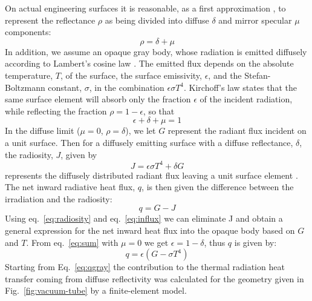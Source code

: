 On actual engineering surfaces it is reasonable, as a first approximation \cite{sparrow_1965, siegel-howell-3}, to represent the reflectance
$\rho$ as being divided into diffuse $\delta$ and mirror specular $\mu$
components:
\begin{equation}
\label{eq:reflectivity}
\rho = \delta + \mu
\end{equation}
In addition,
we assume an opaque gray body, whose radiation
is emitted diffusely according to Lambert's cosine law
\cite{siegel-howell-3}. The emitted flux depends on
the absolute temperature, $T$, of the surface, the surface
emissivity, $\epsilon$, and the Stefan-Boltzmann constant, $\sigma$, in the
combination $\epsilon\sigma T^4$. Kirchoff's law states that the same
surface element will absorb only the fraction $\epsilon$ of the incident
radiation, while reflecting the fraction $\rho = 1 - \epsilon$, so
that
\begin{equation}
\label{eq:sum}
\epsilon + \delta + \mu = 1
\end{equation}
In the diffuse limit ($\mu =0$, $\rho=\delta$), we let $G$ represent the radiant flux incident on a unit
surface. Then for a diffusely emitting surface with a
diffuse reflectance, $\delta$, the radiosity, $J$, given
by
\begin{equation}
\label{eq:radiosity}
J = \epsilon\sigma T^4 + \delta G
\end{equation}
represents the diffusely distributed radiant flux leaving
a unit surface element \cite{tsai_1986}. 
The net inward radiative heat flux, $q$, is then given the difference between the irradiation and the radiosity:
\begin{equation}
\label{eq:influx}
q = G - J
\end{equation}
Using eq.~\ref{eq:radiosity} and eq.~\ref{eq:influx} we can eliminate J and obtain a general expression for the net inward heat flux into the opaque body based on $G$ and $T$. From eq.~\ref{eq:sum} with $\mu = 0$ we get $\epsilon = 1 -\delta$, thus $q$ is given by:
\begin{equation}
\label{eq:qgray}
q = \epsilon\left( G - \sigma T^4 \right)
\end{equation}
Starting from Eq.~\ref{eq:qgray} the contribution to the thermal radiation heat transfer coming from diffuse reflectivity was calculated for the geometry given in Fig.~\ref{fig:vacuum-tube} by a finite-element model.
